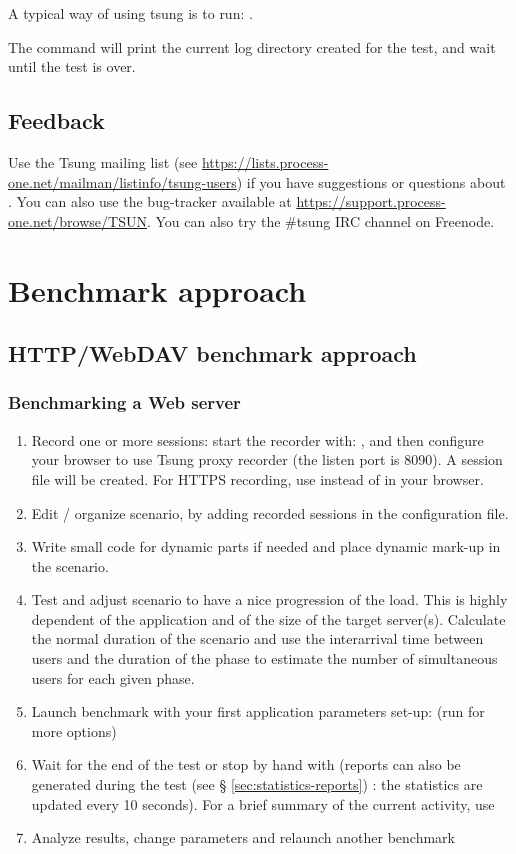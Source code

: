 \documentclass{TSUNG-en}
\begin{document}
A typical way of using tsung is to run:
.

The command will print the current log directory created for the test, and wait until the test is
over.

\subsection{Feedback}

Use the Tsung mailing list (see
\url{https://lists.process-one.net/mailman/listinfo/tsung-users}) if you have
suggestions or questions about . You can also use the
bug-tracker available at \url{https://support.process-one.net/browse/TSUN}.
You can also try the \#tsung IRC channel on Freenode.

\section{Benchmark approach}

\subsection{HTTP/WebDAV benchmark approach}

\subsubsection{Benchmarking a Web server}

\begin{enumerate}
\item Record one or more sessions: start the recorder with:
  , and then configure your browser to use Tsung
  proxy recorder (the listen port is 8090). A session file will be
  created. For HTTPS recording, use  instead of
     in your browser.
\item Edit / organize scenario, by adding recorded sessions in the
  configuration file.
\item Write small code for dynamic parts if needed and place dynamic mark-up
in the scenario.
\item Test and adjust scenario to have a nice progression of the load. This
is highly dependent of the application and of the size of the target
server(s). Calculate the normal duration of the scenario and use the
interarrival time between users and the duration of the phase to estimate
the number of simultaneous users for each given phase.
\item Launch benchmark with your first application parameters set-up:
   (run  for more options)
\item Wait for the end of the test or stop by hand with
   (reports can also be generated during the
  test (see § \ref{sec:statistics-reports}) : the statistics are
  updated every 10 seconds). For a brief summary of the current
  activity, use 
\item Analyze results, change parameters and relaunch another benchmark
\end{enumerate}
\end{document}
